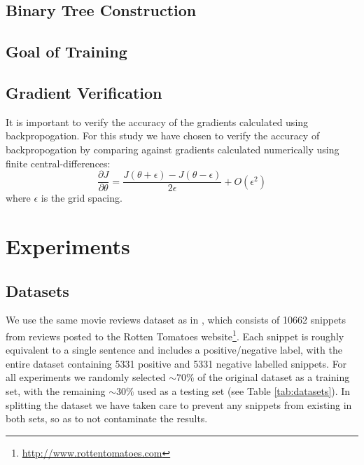 \documentclass{article}
\begin{document}
\subsection{Binary Tree Construction}

\subsection{Goal of Training}


\subsection{Gradient Verification}
It is important to verify the accuracy of the gradients calculated using backpropogation. For this study we have chosen to verify the accuracy of backpropogation by comparing against gradients calculated numerically using finite central-differences:
\begin{equation}
    \frac{\partial J}{\partial \theta} = \frac{J(\theta + \epsilon) - J(\theta - \epsilon)}{2\epsilon} + O(\epsilon ^2)
\end{equation}
where $\epsilon$ is the grid spacing.



\section{Experiments}

%
%
\subsection{Datasets}
We use the same movie reviews dataset as in \cite{Socher}, which consists of 10662 snippets from reviews posted to the Rotten Tomatoes website\footnote{\url{http://www.rottentomatoes.com}}. Each snippet is roughly equivalent to a single sentence and includes a positive/negative label, with the entire dataset containing 5331 positive and 5331 negative labelled snippets. For all experiments we randomly selected $\sim 70\%$ of the original dataset as a training set, with the remaining $\sim 30\%$ used as a testing set (see Table \ref{tab:datasets}). In splitting the dataset we have taken care to prevent any snippets from existing in both sets, so as to not contaminate the results.
\end{document}
